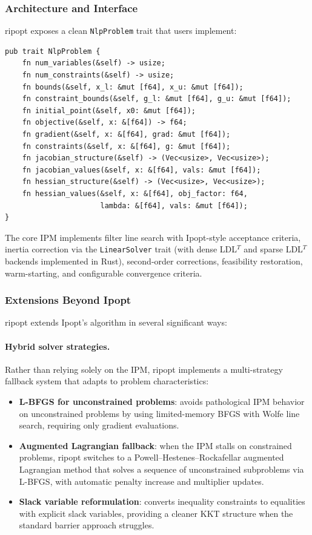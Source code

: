 \documentclass[12pt,preprint]{article}
\begin{document}
\subsubsection{Architecture and Interface}
\label{org-architecture}
ripopt exposes a clean \texttt{NlpProblem} trait that users implement:

\begin{verbatim}
pub trait NlpProblem {
    fn num_variables(&self) -> usize;
    fn num_constraints(&self) -> usize;
    fn bounds(&self, x_l: &mut [f64], x_u: &mut [f64]);
    fn constraint_bounds(&self, g_l: &mut [f64], g_u: &mut [f64]);
    fn initial_point(&self, x0: &mut [f64]);
    fn objective(&self, x: &[f64]) -> f64;
    fn gradient(&self, x: &[f64], grad: &mut [f64]);
    fn constraints(&self, x: &[f64], g: &mut [f64]);
    fn jacobian_structure(&self) -> (Vec<usize>, Vec<usize>);
    fn jacobian_values(&self, x: &[f64], vals: &mut [f64]);
    fn hessian_structure(&self) -> (Vec<usize>, Vec<usize>);
    fn hessian_values(&self, x: &[f64], obj_factor: f64,
                      lambda: &[f64], vals: &mut [f64]);
}
\end{verbatim}

The core IPM implements filter line search with Ipopt-style acceptance criteria, inertia correction via the \texttt{LinearSolver} trait (with dense LDL$^T$ and sparse LDL$^T$ backends implemented in Rust), second-order corrections, feasibility restoration, warm-starting, and configurable convergence criteria.

\subsubsection{Extensions Beyond Ipopt}
\label{org-ripopt-extensions}

ripopt extends Ipopt's algorithm in several significant ways:

\paragraph{Hybrid solver strategies.}
Rather than relying solely on the IPM, ripopt implements a multi-strategy fallback system that adapts to problem characteristics:
\begin{itemize}
\item \textbf{L-BFGS for unconstrained problems}: avoids pathological IPM behavior on unconstrained problems by using limited-memory BFGS with Wolfe line search, requiring only gradient evaluations.
\item \textbf{Augmented Lagrangian fallback}: when the IPM stalls on constrained problems, ripopt switches to a Powell--Hestenes--Rockafellar augmented Lagrangian method that solves a sequence of unconstrained subproblems via L-BFGS, with automatic penalty increase and multiplier updates.
\item \textbf{Slack variable reformulation}: converts inequality constraints to equalities with explicit slack variables, providing a cleaner KKT structure when the standard barrier approach struggles.
\end{itemize}
\end{document}
